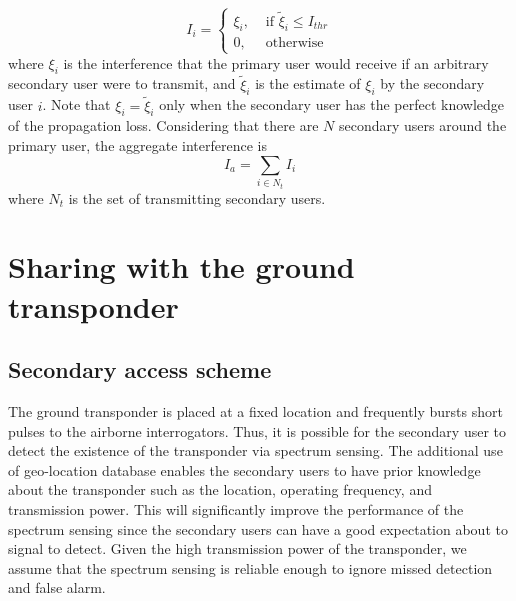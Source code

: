 \documentclass[12pt,submission,journal,onecolumn]{IEEEtran}
\begin{document}
\begin{equation}
\label{eq:InterferenceRule}
I_{i}= \left\{ \begin{array} {rl} \xi_{i}, &\mbox{ if $\tilde{\xi}_{i}\leq I_{thr}$}\\
0, &\mbox{ otherwise}
       \end{array} \right.
\end{equation}
where $ \xi_{i}$ is the interference that the primary user would receive if an arbitrary secondary user were to transmit, and $\tilde{\xi}_{i}$ is the estimate of $ \xi_{i}$ by the secondary user $i$. Note that $\xi_{i} = \tilde{\xi}_{i}$ only when the secondary user has the perfect knowledge of the propagation loss. Considering that there are $N$ secondary users around the primary user, the aggregate interference is
\begin{equation}
\label{eq:Ia}
I_{a}= \sum_{i\in N_{t}} I_{i}
\end{equation}
where $N_{t}$ is the set of transmitting secondary users.

\section{Sharing with the ground transponder}
\label{sec:interferenceGround}

\subsection{Secondary access scheme}
\label{subsec:GroundScheme}
The ground transponder is placed at a fixed location and frequently bursts short pulses to the airborne interrogators. Thus, it is possible for the secondary user to detect the existence of the transponder via spectrum sensing. The additional use of geo-location database enables the secondary users to have prior knowledge about the transponder such as the location, operating frequency, and transmission power. This will significantly improve the performance of the spectrum sensing since the secondary users can have a good expectation about to signal to detect. Given the high transmission power of the transponder, we assume that the spectrum sensing is reliable enough to ignore missed detection and false alarm.
\end{document}
